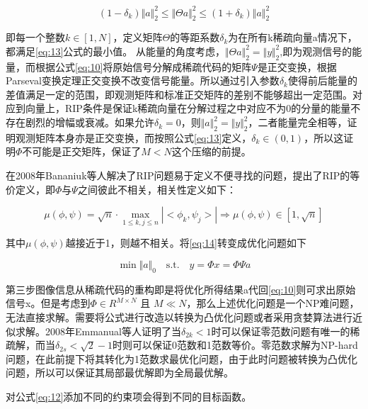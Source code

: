 \begin{equation}
  \label{eq:13}
  (1-\delta_k) \Vert a \Vert_2^2 \leq \Vert \Theta a \Vert_2^2 \leq (1+\delta_k) \Vert a \Vert_2^2
\end{equation}

即每一个整数$k \in \left[1,N\right]$，定义矩阵$\Theta$的等距系数$\delta_{k}$为在所有k稀疏向量a情况下，都满足\ref{eq:13}公式的最小值。
从能量的角度考虑，$\Vert \Theta a \Vert_2^2 = \Vert y\Vert_2^2$,即为观测信号的能量，而根据公式\ref{eq:10}将原始信号分解成稀疏代码的矩阵$\Psi$是正交变换，根据Parseval变换定理正交变换不改变信号能量。所以通过引入参数$\delta_k$使得前后能量的差值满足一定的范围，即观测矩阵和标准正交矩阵的差别不能够超出一定范围。对应到向量上，RIP条件是保证k稀疏向量在分解过程之中对应不为0的分量的能量不存在剧烈的增幅或衰减。如果允许$\delta_k = 0$，则$\Vert a \Vert_2^2 = \Vert y\Vert_2^2$，二者能量完全相等，证明观测矩阵本身亦是正交变换，而按照公式\ref{eq:13}定义，$\delta_k \in (0,1)$，所以这证明$\Phi$不可能是正交矩阵，保证了$M < N$这个压缩的前提。

在2008年Bananiuk等人\cite{Compressive_sensing_[Lecture_Notes]}解决了RIP问题易于定义不便寻找的问题，提出了RIP的等价定义，即$\Phi$与$\Psi$之间彼此不相关，相关性定义如下：

\begin{equation}
  \label{eq:11}
  \mu(\phi, \psi) = \sqrt{n} \cdot \mathop{\max}_{1 \leq k,j \leq n} |<\phi_k,\psi_j>| \Rightarrow \mu(\phi, \psi) \in \left[ 1,\sqrt{n}  \right]
\end{equation}

其中$\mu(\phi, \psi)$越接近于1，则越不相关。将\ref{eq:14}转变成优化问题如下

\begin{equation}
  \label{eq:12}
  \min \Vert a \Vert_0 \quad \text{s.t.} \quad y = \Phi x = \Phi \Psi a
\end{equation}

第三步图像信息从稀疏代码的重构即是将优化所得结果a代回\ref{eq:10}则可求出原始信号x。但是考虑到$\Phi \in R^{M \times N}$ 且  $M \ll N$，那么上述优化问题是一个NP难问题，无法直接求解。需要将公式进行改造以转换为凸优化问题或者采用贪婪算法进行近似求解。2008年Emmanual等人\cite{The_restricted_isometry_property_and_its_implications_for_compressed_sensing}证明了当$\delta_{2k} < 1$时可以保证零范数问题有唯一的稀疏解，而当$\delta_{2s}<\sqrt2-1$时则可以保证0范数和1范数等价。零范数求解为NP-hard问题，在此前提下将其转化为1范数求最优化问题，由于此时问题被转换为凸优化问题，所以可以保证其局部最优解即为全局最优解。

对公式\ref{eq:12}添加不同的约束项会得到不同的目标函数。

